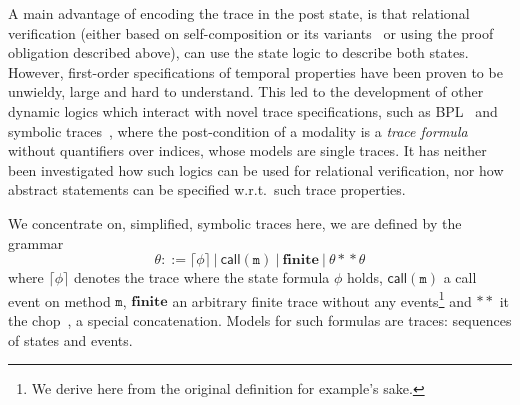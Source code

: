 A main advantage of encoding the trace in the post state, is that relational verification (either based on self-composition or its variants~\cite{DBLP:conf/spc/DarvasHS05,DBLP:conf/csfw/BartheDR04,DBLP:conf/fm/BartheCK11} or using the proof obligation described above),
can use the state logic to describe both states.
However, first-order specifications of temporal properties have been proven to be unwieldy, large and hard to understand. 
This led to the development of other dynamic logics which interact with novel trace specifications, such as BPL~\cite{DBLP:conf/tableaux/Kamburjan19} and symbolic traces~\cite{DBLP:conf/tableaux/BubelDHN15}, where the post-condition of a modality is a \emph{trace formula} without quantifiers over indices, whose models are single traces.
It has neither been investigated how such logics can be used for relational verification, nor how abstract statements can be specified w.r.t.\ such trace properties.


We concentrate on, simplified, symbolic traces here, we are defined by the grammar
\[\theta ::= \lceil \phi \rceil ~|~ \mathsf{call}(\mathtt{m}) ~|~ \mathbf{finite} ~|~ \theta \ast\!\ast \theta \]
where $\lceil \phi \rceil$ denotes the trace where the state formula $\phi$ holds, $\mathsf{call}(\mathtt{m})$ a call event on method $\mathtt{m}$, $\mathbf{finite}$ an arbitrary finite trace without any events\footnote{We derive here from the original definition for example's sake.} and $\ast\ast$ it the chop~\cite{DBLP:conf/tableaux/BubelDHN15}, a special concatenation. Models for such formulas are traces: sequences of states and events.

